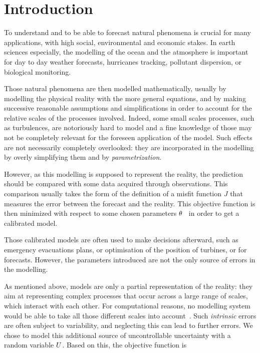 \documentclass[../../Main_ManuscritThese.tex]{subfiles}
\begin{document}
\pagestyle{introStyle}
\chapter*{Introduction}
\TitleBtwLines

{}
\label{chap:Introduction}





To understand and to be able to forecast natural phenomena is crucial
for many applications, with high social, environmental and economic
stakes.  In earth sciences especially, the modelling of the ocean and
the atmosphere is important for day to day weather forecasts,
hurricanes tracking, pollutant dispersion, or biological monitoring.

Those natural phenomena are then modelled mathematically, usually by
modelling the physical reality with the more general equations, and by
making successive reasonable assumptions and simplifications in order
to account for the relative scales of the processes involved. Indeed,
some small scales processes, such as turbulences, are notoriously hard
to model and a fine knowledge of those may not be completely relevant
for the foreseen application of the model. Such effects are not
necessarily completely overlooked: they are incorporated in the
modelling by overly simplifying them and by \emph{parametrization}.

However, as this modelling is supposed to represent the reality, the
prediction should be compared with some data acquired through
observations. This comparison usually takes the form of the definition
of a misfit function $J$ that measures the error between the forecast
and the reality. This objective function is then minimized with
respect to some chosen parameters
$\theta$~\cite{das_estimation_1991,das_variational_1992,boutet_estimation_2015}
in order to get a calibrated model.

Those calibrated models are often used to make decisions afterward,
such as emergency evacuations plans, or optimisation of the position
of turbines, or for forecasts. However, the parameters introduced are
not the only source of errors in the modelling.

As mentioned above, models are only a partial representation of the
reality: they aim at representing complex processes that occur across
a large range of scales, which interact with each other. For
computational reasons, no modelling system would be able to take all
those different scales into
account~\cite{mcwilliams_irreducible_2007}. Such \emph{intrinsic}
errors are often subject to variability, and neglecting this can lead
to further errors. We chose to model this additional source of
uncontrollable uncertainty with a random variable $U$.
Based on this, the objective function is 
\end{document}
